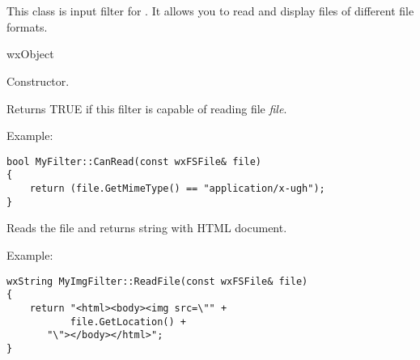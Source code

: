 %
%


\section{}\label{wxhtmlfilter}

This class is input filter for .
It allows you to read and display files of different file formats.


wxObject





\label{wxhtmlfilterwxhtmlfilter}


Constructor.

\label{wxhtmlfiltercanread}


Returns TRUE if this filter is capable of reading file {\it file}.

Example:

\begin{verbatim}
bool MyFilter::CanRead(const wxFSFile& file)
{
    return (file.GetMimeType() == "application/x-ugh");
}
\end{verbatim}

\label{wxhtmlfilterreadfile}



Reads the file and returns string with HTML document.

Example:

\begin{verbatim}
wxString MyImgFilter::ReadFile(const wxFSFile& file)
{
    return "<html><body><img src=\"" +
           file.GetLocation() +
	   "\"></body></html>";
}
\end{verbatim}


